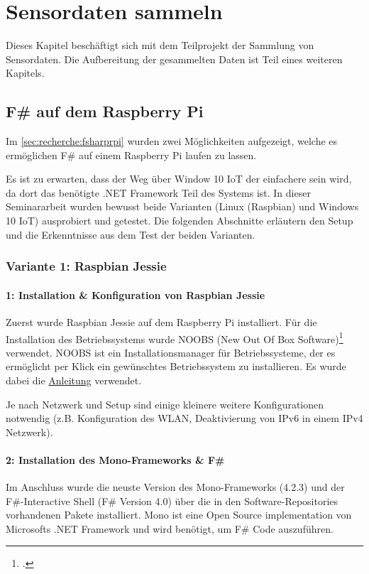 
\chapter{Sensordaten sammeln}
Dieses Kapitel beschäftigt sich mit dem Teilprojekt der Sammlung von Sensordaten. Die Aufbereitung der gesammelten Daten ist Teil eines weiteren Kapitels.


\section{F\# auf dem Raspberry Pi}
Im \cref{sec:recherche:fsharprpi}  wurden zwei Möglichkeiten aufgezeigt, welche es ermöglichen F\# auf einem Raspberry Pi laufen zu lassen.

Es ist zu erwarten, dass der Weg über Window 10 IoT der einfachere sein wird, da dort das benötigte .NET Framework Teil des Systems ist. In dieser Seminararbeit wurden bewusst beide Varianten (Linux (Raspbian) und Windows 10 IoT) ausprobiert und getestet. Die folgenden Abschnitte erläutern den Setup und die Erkenntnisse aus dem Test der beiden Varianten. 

\subsection{Variante 1: Raspbian Jessie}
\subsubsection{1: Installation \& Konfiguration von Raspbian Jessie}
\label{sec:collect:fsharp:variant1:installation}
Zuerst wurde Raspbian Jessie auf dem Raspberry Pi installiert. Für die Installation des Betriebssystems wurde NOOBS (New Out Of Box Software)\footcite{NOOBS_2016-04-25} verwendet. NOOBS ist ein Installationsmanager für Betriebssysteme, der es ermöglicht per Klick ein gewünschtes Betriebssystem zu installieren. Es wurde dabei die \hyperlink{https://www.raspberrypi.org/documentation/installation/noobs.md}{Anleitung} verwendet.

Je nach Netzwerk und Setup sind einige kleinere weitere Konfigurationen notwendig (z.B. Konfiguration des WLAN, Deaktivierung von IPv6 in einem IPv4 Netzwerk).


\subsubsection{2: Installation des Mono-Frameworks \& F\#}
\label{sec:collect:fsharp:variant1:mono}
Im Anschluss wurde die neuste Version des Mono-Frameworks (4.2.3) und der F\#-Interactive Shell (F\# Version 4.0) über die in den Software-Repositories vorhandenen Pakete installiert. Mono ist eine Open Source implementation von Microsofts .NET Framework und wird benötigt, um F\# Code auszuführen.

